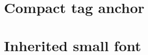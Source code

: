 \documentclass[twocolumn]{article}
\begin{document}
\section*{Compact tag anchor}

\newpage
\section*{Inherited small font}
\small

\end{document}
